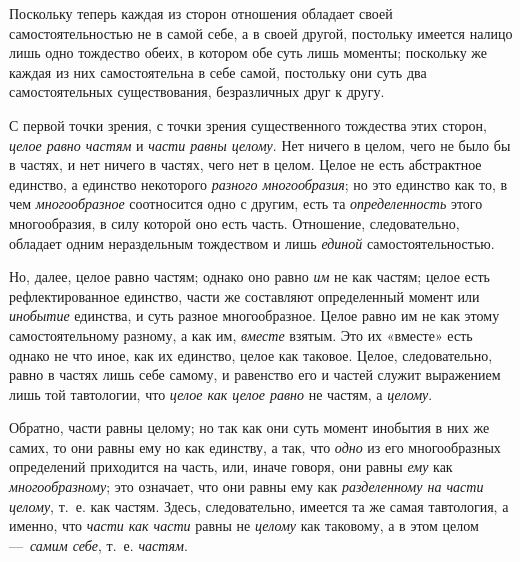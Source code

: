 Поскольку теперь каждая из сторон отношения обладает своей
самостоятельностью не в самой себе, а в своей другой, постольку имеется
налицо лишь одно тождество обеих, в котором обе суть лишь моменты;
поскольку же каждая из них самостоятельна в себе самой, постольку они суть
два самостоятельных существования, безразличных друг к другу.

С первой точки зрения, с точки зрения существенного тождества этих сторон,
{\em целое равно частям} и
{\em части равны целому}. Нет ничего в целом, чего не
было бы в частях, и нет ничего в частях, чего нет в целом. Целое не есть
абстрактное единство, а единство некоторого
{\em разного многообразия}; но это единство как то, в
чем {\em многообразное} соотносится одно с другим, есть
та {\em определенность} этого многообразия, в силу
которой оно есть часть. Отношение, следовательно, обладает одним
нераздельным тождеством и лишь {\em единой}
самостоятельностью.

Но, далее, целое равно частям; однако оно равно {\em им}
не как частям; целое есть рефлектированное единство, части же составляют
определенный момент или {\em инобытие} единства, и суть
разное многообразное. Целое равно им не как этому самостоятельному разному,
а как им, {\em вместе} взятым. Это их «вместе» есть
однако не что иное, как их единство, целое как таковое. Целое,
следовательно, равно в частях лишь себе самому, и равенство его и частей
служит выражением лишь той тавтологии, что {\em целое
как целое равно} не частям, а {\em целому}.

Обратно, части равны целому; но так как они суть момент инобытия в них же
самих, то они равны ему но как единству, а так, что
{\em одно} из его многообразных определений приходится
на часть, или, иначе говоря, они равны {\em ему} как
{\em многообразному}; это означает, что они равны ему
как {\em разделенному на части целому}, т.~е. как
частям. Здесь, следовательно, имеется та же самая тавтология, а именно, что
{\em части как части} равны не
{\em целому} как таковому, а в этом целом
—~{\em самим себе}, т.~е.
{\em частям}.

